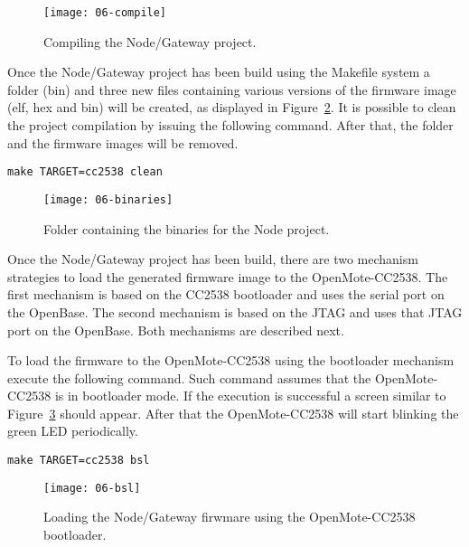 \begin{figure}[!ht]
    \centering
	\texttt{[image: 06-compile]}
    \caption{Compiling the Node/Gateway project.}
    \label{fig:06-compile}
\end{figure}

Once the Node/Gateway project has been build using the Makefile system a folder (bin) and three new files containing various versions of the firmware image (elf, hex and bin) will be created, as displayed in Figure~\ref{fig:06-binaries}. It is possible to clean the project compilation by issuing the following command. After that, the folder and the firmware images will be removed.

\begin{verbatim}
make TARGET=cc2538 clean
\end{verbatim}

\begin{figure}[!ht]
    \centering
	\texttt{[image: 06-binaries]}
    \caption{Folder containing the binaries for the Node project.}
    \label{fig:06-binaries}
\end{figure}

Once the Node/Gateway project has been build, there are two mechanism strategies to load the generated firmware image to the OpenMote-CC2538. The first mechanism is based on the CC2538 bootloader and uses the serial port on the OpenBase. The second mechanism is based on the JTAG and uses that JTAG port on the OpenBase. Both mechanisms are described next.

To load the firmware to the OpenMote-CC2538 using the bootloader mechanism execute the following command. Such command assumes that the OpenMote-CC2538 is in bootloader mode. If the execution is successful a screen similar to Figure~\ref{fig:06-bsl} should appear. After that the OpenMote-CC2538 will start blinking the green LED periodically.

\begin{verbatim}
make TARGET=cc2538 bsl
\end{verbatim}

\begin{figure}[!ht]
    \centering
	\texttt{[image: 06-bsl]}
    \caption{Loading the Node/Gateway firwmare using the OpenMote-CC2538 bootloader.}
    \label{fig:06-bsl}
\end{figure}

